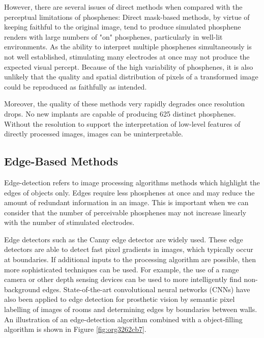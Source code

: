 \documentclass[a4paper,11pt,openany]{book}
\begin{document}
However, there are several issues of direct methods when compared with the perceptual limitations of phosphenes:
Direct mask-based methods, by virtue of keeping faithful to the original image, tend to produce simulated phosphene renders with large numbers of "on" phosphenes, particularly in well-lit environments.
As the ability to interpret multiple phosphenes simultaneously is not well established, stimulating many electrodes at once may not produce the expected visual percept.
Because of the high variability of phosphenes, it is also unlikely that the quality and spatial distribution of pixels of a transformed image could be reproduced as faithfully as intended.

Moreover, the quality of these methods very rapidly degrades once resolution drops. \cite{li_image_2018}
No new implants are capable of producing 625 distinct phosphenes. \cite{lewis_restoration_2015}
Without the resolution to support the interpretation of low-level features of directly processed images, images can be uninterpretable.

\subsection*{Edge-Based Methods}
\label{sec:org0ee0023}

Edge-detection refers to image processing algorithms methods which highlight the edges of objects only. \cite{canny_readings_1987}
Edges require less phosphenes at once and may reduce the amount of redundant information in an image.
This is important when we can consider that the number of perceivable phosphenes may not increase linearly with the number of stimulated electrodes. \cite{bosking_rules_2018}

Edge detectors such as the Canny \cite{canny_readings_1987} edge detector are widely used.
These edge detectors are able to detect fast pixel gradients in images, which typically occur at boundaries.
If additional inputs to the processing algorithm are possible, then more sophisticated techniques can be used.
For example, the use of a range camera or other depth sensing devices can be used to more intelligently find non-background edges. \cite{lui_transformative_2012}
State-of-the-art convolutional neural networks (CNNs) have also been applied to edge detection for prosthetic vision by semantic pixel labelling of images of rooms and determining edges by boundaries between walls. \cite{sanchez-garcia_structural_2018}
An illustration of an edge-detection algorithm combined with a object-filling algorithm is shown in Figure \ref{fig:org3262cb7}.
\end{document}
